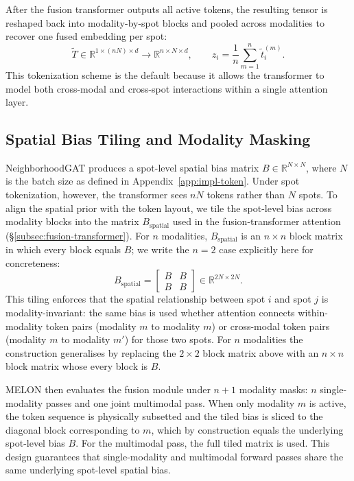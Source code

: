 \documentclass{article}
\theoremstyle{plain}
\theoremstyle{definition}
\begin{document}
After the fusion transformer outputs all active tokens, the resulting tensor is reshaped back into modality-by-spot blocks and pooled across modalities to recover one fused embedding per spot:
\begin{equation}
  \tilde{T} \in \mathbb{R}^{1 \times (nN) \times d}
  \rightarrow
  \mathbb{R}^{n \times N \times d},
  \qquad
  z_i = \frac{1}{n}\sum_{m=1}^{n} \tilde{t}^{(m)}_i.
\end{equation}
This tokenization scheme is the default because it allows the transformer to model both cross-modal and cross-spot interactions within a single attention layer.

\subsection{Spatial Bias Tiling and Modality Masking}\label{app:impl-bias}

NeighborhoodGAT produces a spot-level spatial bias matrix $B \in \mathbb{R}^{N \times N}$, where $N$ is the batch size as defined in Appendix~\ref{app:impl-token}. Under spot tokenization, however, the transformer sees $nN$ tokens rather than $N$ spots. To align the spatial prior with the token layout, we tile the spot-level bias across modality blocks into the matrix $B_{\mathrm{spatial}}$ used in the fusion-transformer attention (\S\ref{subsec:fusion-transformer}). For $n$ modalities, $B_{\mathrm{spatial}}$ is an $n \times n$ block matrix in which every block equals $B$; we write the $n=2$ case explicitly here for concreteness:
\begin{equation}
  B_{\mathrm{spatial}} =
  \begin{bmatrix}
    B & B \\
    B & B
  \end{bmatrix}
  \in \mathbb{R}^{2N \times 2N}.
\end{equation}
This tiling enforces that the spatial relationship between spot $i$ and spot $j$ is modality-invariant: the same bias is used whether attention connects within-modality token pairs (modality $m$ to modality $m$) or cross-modal token pairs (modality $m$ to modality $m'$) for those two spots. For $n$ modalities the construction generalises by replacing the $2 \times 2$ block matrix above with an $n \times n$ block matrix whose every block is $B$.

MELON then evaluates the fusion module under $n + 1$ modality masks: $n$ single-modality passes and one joint multimodal pass. When only modality $m$ is active, the token sequence is physically subsetted and the tiled bias is sliced to the diagonal block corresponding to $m$, which by construction equals the underlying spot-level bias $B$. For the multimodal pass, the full tiled matrix is used. This design guarantees that single-modality and multimodal forward passes share the same underlying spot-level spatial bias.
\end{document}
